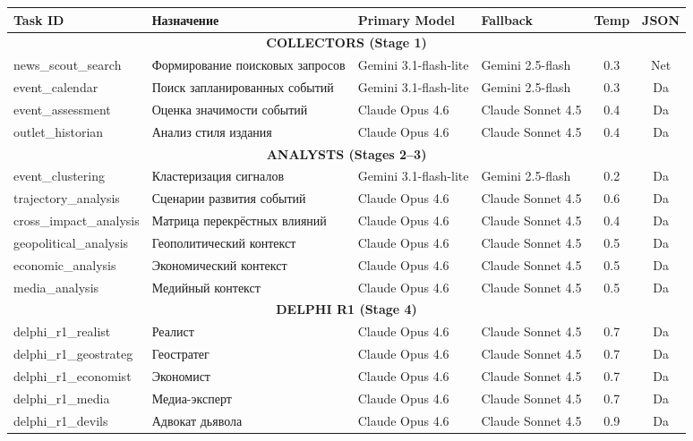 \begin{table}[h]
\centering
\tiny
\begin{tabular}{|l|l|l|l|c|c|}
\hline
\textbf{Task ID} & \textbf{Назначение} & \textbf{Primary Model} & \textbf{Fallback} & \textbf{Temp} & \textbf{JSON} \\
\hline
\multicolumn{6}{|c|}{\textbf{COLLECTORS (Stage 1)}} \\
\hline
news\_scout\_search & Формирование поисковых запросов & Gemini 3.1-flash-lite & Gemini 2.5-flash & 0.3 & Net \\
event\_calendar & Поиск запланированных событий & Gemini 3.1-flash-lite & Gemini 2.5-flash & 0.3 & Da \\
event\_assessment & Оценка значимости событий & Claude Opus 4.6 & Claude Sonnet 4.5 & 0.4 & Da \\
outlet\_historian & Анализ стиля издания & Claude Opus 4.6 & Claude Sonnet 4.5 & 0.4 & Da \\
\hline
\multicolumn{6}{|c|}{\textbf{ANALYSTS (Stages 2–3)}} \\
\hline
event\_clustering & Кластеризация сигналов & Gemini 3.1-flash-lite & Gemini 2.5-flash & 0.2 & Da \\
trajectory\_analysis & Сценарии развития событий & Claude Opus 4.6 & Claude Sonnet 4.5 & 0.6 & Da \\
cross\_impact\_analysis & Матрица перекрёстных влияний & Claude Opus 4.6 & Claude Sonnet 4.5 & 0.4 & Da \\
geopolitical\_analysis & Геополитический контекст & Claude Opus 4.6 & Claude Sonnet 4.5 & 0.5 & Da \\
economic\_analysis & Экономический контекст & Claude Opus 4.6 & Claude Sonnet 4.5 & 0.5 & Da \\
media\_analysis & Медийный контекст & Claude Opus 4.6 & Claude Sonnet 4.5 & 0.5 & Da \\
\hline
\multicolumn{6}{|c|}{\textbf{DELPHI R1 (Stage 4)}} \\
\hline
delphi\_r1\_realist & Реалист & Claude Opus 4.6 & Claude Sonnet 4.5 & 0.7 & Da \\
delphi\_r1\_geostrateg & Геостратег & Claude Opus 4.6 & Claude Sonnet 4.5 & 0.7 & Da \\
delphi\_r1\_economist & Экономист & Claude Opus 4.6 & Claude Sonnet 4.5 & 0.7 & Da \\
delphi\_r1\_media & Медиа-эксперт & Claude Opus 4.6 & Claude Sonnet 4.5 & 0.7 & Da \\
delphi\_r1\_devils & Адвокат дьявола & Claude Opus 4.6 & Claude Sonnet 4.5 & 0.9 & Da \\

\end{tabular}
\end{table}
